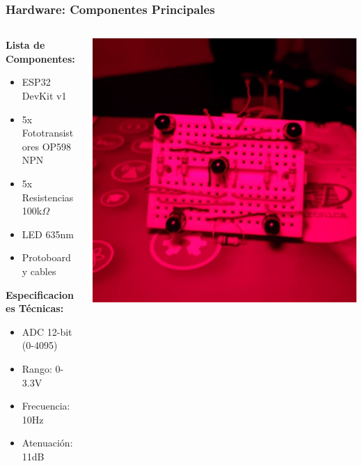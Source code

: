 \documentclass[xcolor=dvipsnames]{beamer}
\begin{document}
\begin{frame}
    \frametitle{Hardware: Componentes Principales}
    \begin{columns}
        \begin{column}{0.5\textwidth}
            \textbf{Lista de Componentes:}
            \begin{itemize}
                \item ESP32 DevKit v1
                \item 5x Fototransistores OP598 NPN
                \item 5x Resistencias 100k$\Omega$
                \item LED 635nm
                \item Protoboard y cables
            \end{itemize}
            
            \vspace{0.5cm}
            \textbf{Especificaciones Técnicas:}
            \begin{itemize}
                \item ADC 12-bit (0-4095)
                \item Rango: 0-3.3V
                \item Frecuencia: 10Hz
                \item Atenuación: 11dB
            \end{itemize}
        \end{column}
        \begin{column}{0.5\textwidth}
            \begin{center}
                \includegraphics[width=\textwidth]{../assets/difu.jpeg}
                

\end{center}
\end{column}
\end{columns}
\end{frame}
\end{document}
